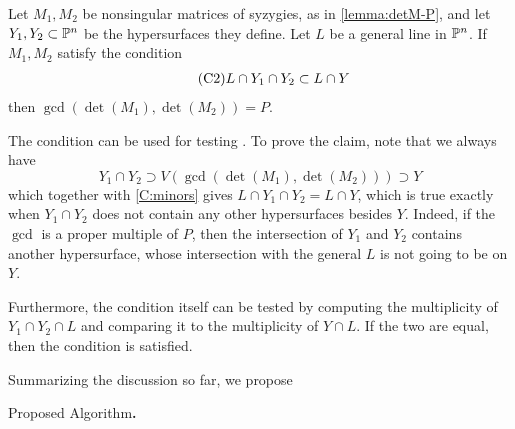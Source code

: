 \documentclass[fleqn,reqno]{amsart}
\begin{document}
\begin{paragraf}
\label{par:intersect-general-line}
Let $M_1,M_2$ be nonsingular matrices of syzygies, as in \eqref{lemma:detM-P},
and let $Y_1,Y_2\subset\mathbb{P}^n$ be the hypersurfaces they define.
Let $L$ be a general line in $\mathbb{P}^n$.
If $M_1,M_2$ satisfy the condition
\begin{align}
	\label{C:minors}
	\tag{C2}
	L\cap Y_1\cap Y_2\subset L\cap Y
\end{align}
then $\gcd(\det(M_1),\det(M_2))=P$.

The condition can be used for testing .
To prove the claim, note that we always have
\[
	Y_1\cap Y_2\supset V(\gcd(\det(M_1),\det(M_2)))\supset Y
\]
which together with \eqref{C:minors} gives $L\cap Y_1\cap Y_2=L\cap Y$,
which is true exactly when $Y_1\cap Y_2$ does not contain any other hypersurfaces besides $Y$.
Indeed, if the $\gcd$ is a proper multiple of $P$, then the intersection of
$Y_1$ and $Y_2$ contains another hypersurface, whose intersection with the general $L$
is not going to be on $Y$.

Furthermore, the condition itself can be tested by computing the multiplicity
of $Y_1\cap Y_2\cap L$ and comparing it to the multiplicity of $Y\cap L$.
If the two are equal, then the condition is satisfied.
\end{paragraf}

\begin{paragraf*}
Summarizing the discussion so far, we propose
\end{paragraf*}

\begin{algorithm}{\sc Proposed Algorithm}{\bf.}
\label{algo:proposed}
\begin{algorithmic}
\State{}
\EndWhile
{}
\EndWhile
{}
\end{algorithmic}
\end{algorithm}
\end{document}
